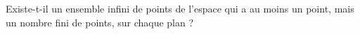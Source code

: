 Existe-t-il un ensemble infini de points de l'espace qui a au moins un point, mais un nombre fini de points, sur chaque plan ?
